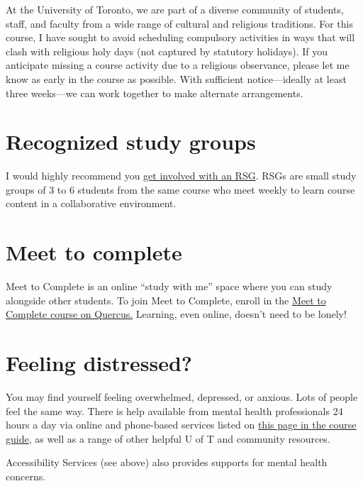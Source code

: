 \documentclass[
  openany]{book}
\begin{document}
At the University of Toronto, we are part of a diverse community of students, staff, and faculty from a wide range of cultural and religious traditions. For this course, I have sought to avoid scheduling compulsory activities in ways that will clash with religious holy days (not captured by statutory holidays). If you anticipate missing a course activity due to a religious observance, please let me know as early in the course as possible. With sufficient notice---ideally at least three weeks---we can work together to make alternate arrangements.

\hypertarget{recognized-study-groups}{%
\section{Recognized study groups}\label{recognized-study-groups}}

I would highly recommend you \href{https://sidneysmithcommons.artsci.utoronto.ca/recognized-study-groups/join/}{get involved with an RSG}. RSGs are small study groups of 3 to 6 students from the same course who meet weekly to learn course content in a collaborative environment.

\hypertarget{meet-to-complete}{%
\section{Meet to complete}\label{meet-to-complete}}

Meet to Complete is an online ``study with me'' space where you can study alongside other students. To join Meet to Complete, enroll in the \href{https://q.utoronto.ca/enroll/8CXECE}{Meet to Complete course on Quercus.} Learning, even online, doesn't need to be lonely!

\hypertarget{feeling-distressed}{%
\section{Feeling distressed?}\label{feeling-distressed}}

You may find yourself feeling overwhelmed, depressed, or anxious. Lots of people feel the same way. There is help available from mental health professionals 24 hours a day via online and phone-based services listed on \href{https://sta303-bolton.github.io/sta303-w22-courseguide/resources.html\#student-support-services-and-resources}{this page in the course guide}, as well as a range of other helpful U of T and community resources.

Accessibility Services (see above) also provides supports for mental health concerns.
\end{document}
